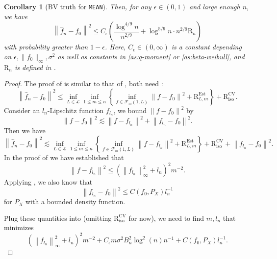 \documentclass[12pt]{article}
\newtheorem{corollary}[theorem]{Corollary}
\begin{document}
\begin{appendices}
\begin{corollary}[BV truth for \texttt{MEAN}]
Then, for any $\epsilon\in(0,1)$ and large enough $n$, we have
\begin{equation*}
\left\|\widehat{f}_n-f_0\right\|^2 \leq C_\epsilon\left(\frac{\log ^{4 / 9} n}{n^{2 / 9}}+\log ^{5 / 9} n \cdot n^{2 / 9} \mathrm{R}_n\right)
\end{equation*}
with probability greater than $1-\epsilon$. Here, $C_\epsilon \in (0, \infty)$ is a constant depending on $\epsilon, \|f_0\|_\infty, \sigma^2$ as well as constants in \ref{as:q-moment} or \ref{as:beta-weibull}, and $\mathrm{R}_n$ is defined in .
\end{corollary}
\begin{proof}
The proof of  is similar to that of , both need :
\begin{equation*}
\left\|\widehat{f}_n-f_0\right\|^2 \leq \inf _{L \in \mathcal{L}} \inf _{1 \leq m \leq n}\left\{\inf _{f \in \mathcal{F}_m(1, L)}\left\|f-f_0\right\|^2+\mathrm{R}_{L,m}^{\mathrm{Est}}\right\}+\mathrm{R}_{\mathrm{iso}}^{\mathrm{CV}}.
\end{equation*}
Consider an $l_n$-Lipschitz function $f_{l_n}$, we bound $\left\|f-f_0\right\|^2$ by
\begin{equation*}
\left\|f-f_0\right\|^2 \lesssim\left\|f-f_{l_n}\right\|^2+\left\|f_{l_n}-f_0\right\|^2.
\end{equation*}
Then we have 
\begin{equation}\label{eq: bv before plug in}
\left\|\widehat{f}_n-f_0\right\|^2 \lesssim \inf _{L \in \mathcal{L}} \inf _{1 \leq m \leq n}\left\{\inf _{f \in \mathcal{F}_m(1, L)}\left\|f-f_{l_n}\right\|^2+\mathrm{R}_{L,m}^{\mathrm{Est}}\right\}+\mathrm{R}_{\mathrm{iso}}^{\mathrm{CV}}+\left\|f_{l_n}-f_0\right\|^2.
\end{equation}
In the proof of  we have established that 
\begin{equation*}
\left\|f-f_{l_n}\right\|^2 \leq\left(\left\|f_{l_n}\right\|_{\infty}^2+l_n\right)^2 m^{-2}.
\end{equation*}
Applying , we also know that 
\begin{equation*}
\left\|f_{l_n}-f_0\right\|^2 \leq C\left(f_0, P_X\right) l_n^{-1}
\end{equation*}
for $P_X$ with a bounded density function.

Plug these quantities into  (omitting $\mathrm{R}_{\text {iso }}^{\mathrm{CV}}$ for now), we need to find $m,l_n$ that minimizes
\begin{equation*}
\left(\left\|f_{l_n}\right\|_{\infty}^2+l_n\right)^2 m^{-2}+C_\epsilon m \sigma^2 B_n^2 \log ^2(n) n^{-1}+C\left(f_0, P_X\right) l_n^{-1} .
\end{equation*}


\end{proof}
\end{appendices}
\end{document}
